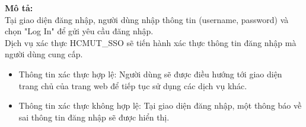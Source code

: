     \textbf{Mô tả:}\\
    
        Tại giao diện đăng nhập, người dùng nhập thông tin (username, password) và chọn "Log In" để gửi yêu cầu đăng nhập.\\
        
        Dịch vụ xác thực HCMUT\_SSO sẽ tiến hành xác thực thông tin đăng nhập mà người dùng cung cấp.
        \begin{itemize}
            \item Thông tin xác thực hợp lệ: Người dùng sẽ được điều hướng tới giao diện trang chủ của trang web để tiếp tục sử dụng các dịch vụ khác.
            \item Thông tin xác thực không hợp lệ: Tại giao diện đăng nhập, một thông báo về sai thông tin đăng nhập sẽ được hiển thị.
        \end{itemize}
        
